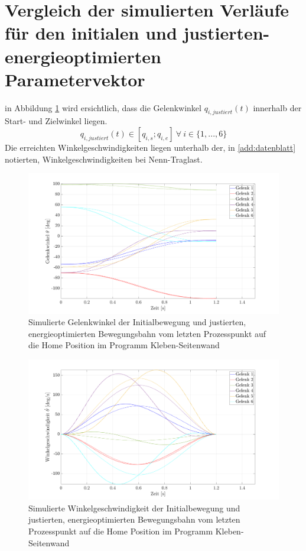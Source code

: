\section{Vergleich der simulierten Verläufe für den initialen und justierten-energieoptimierten Parametervektor}
\label{add:optupjust}
%
in Abbildung \ref{fig:posoptfinal} wird ersichtlich, dass die Gelenkwinkel $q_{i,justiert}(t)$ innerhalb der Start- und Zielwinkel liegen.
%
\begin{equation}
	q_{i,justiert}(t) \in [q_{i,s};q_{i,e}] ~\forall~ i \in \{1,...,6\}
\end{equation}
%
Die erreichten Winkelgeschwindigkeiten liegen unterhalb der, in \ref{add:datenblatt} notierten, Winkelgeschwindigkeiten bei Nenn-Traglast.
%
\begin{figure}[tbph]
	\centering
	\includegraphics[width=1\linewidth]{images/Optimierungsergebnisse_up/posoptfinal}
	\caption{Simulierte Gelenkwinkel  der Initialbewegung  und justierten, energieoptimierten Bewegungsbahn vom letzten Prozesspunkt auf die  Home Position im Programm Kleben-Seitenwand}
	\label{fig:posoptfinal}
\end{figure}
%
\begin{figure}[tbph]
	\centering
	\includegraphics[width=1\linewidth]{images/Optimierungsergebnisse_up/veloptfinal}
	\caption{Simulierte Winkelgeschwindigkeit  der Initialbewegung  und justierten, energieoptimierten Bewegungsbahn vom letzten Prozesspunkt auf die  Home Position im Programm Kleben-Seitenwand}
	\label{fig:veloptfinal}
\end{figure}
